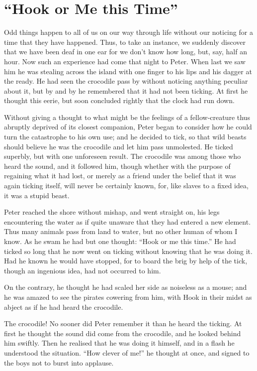 
\chapter{“Hook or Me this Time”}

Odd things happen to all of us on our way through life
without our noticing for a time that they have happened.
Thus, to take an instance,
we suddenly discover that we have been deaf in one ear for we don’t know how long, but, say, half an hour.
Now such an experience had come that night to Peter.
When last we saw him he was stealing across the island
with one finger to his lips and his dagger at the ready.
He had seen the crocodile pass by without noticing anything peculiar about it,
but by and by he remembered that it had not been ticking.
At first he thought this eerie,
but soon concluded rightly that the clock had run down.

Without giving a thought to what might be the feelings
of a fellow‐creature thus abruptly deprived of its closest companion,
Peter began to consider how he could turn the catastrophe to his own use;
and he decided to tick, so that wild beasts should believe he was the crocodile and let him pass unmolested.
He ticked superbly, but with one unforeseen result.
The crocodile was among those who heard the sound, and it followed him,
though whether with the purpose of regaining what it had lost,
or merely as a friend under the belief that it was again ticking itself,
will never be certainly known, for, like slaves to a fixed idea, it was a stupid beast.

Peter reached the shore without mishap, and went straight on,
his legs encountering the water as if quite unaware that they had entered a new element.
Thus many animals pass from land to water, but no other human of whom I know.
As he swam he had but one thought:
“Hook or me this time.”
He had ticked so long that he now went on ticking without knowing that he was doing it.
Had he known he would have stopped,
for to board the brig by help of the tick, though an ingenious idea, had not occurred to him.

On the contrary, he thought he had scaled her side as noiseless as a mouse;
and he was amazed to see the pirates cowering from him,
with Hook in their midst as abject as if he had heard the crocodile.

The crocodile!
No sooner did Peter remember it than he heard the ticking.
At first he thought the sound did come from the crocodile, and he looked behind him swiftly.
Then he realised that he was doing it himself, and in a flash he understood the situation.
“How clever of me!\@” he thought at once, and signed to the boys not to burst into applause.

